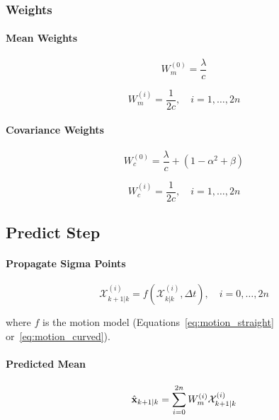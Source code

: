 \subsubsection{Weights}

\paragraph{Mean Weights}
\begin{equation}
W_m^{(0)} = \frac{\lambda}{c}
\label{eq:weight_mean_0}
\end{equation}

\begin{equation}
W_m^{(i)} = \frac{1}{2c}, \quad i = 1, \ldots, 2n
\label{eq:weight_mean_i}
\end{equation}

\paragraph{Covariance Weights}
\begin{equation}
W_c^{(0)} = \frac{\lambda}{c} + (1 - \alpha^2 + \beta)
\label{eq:weight_cov_0}
\end{equation}

\begin{equation}
W_c^{(i)} = \frac{1}{2c}, \quad i = 1, \ldots, 2n
\label{eq:weight_cov_i}
\end{equation}

\subsection{Predict Step}

\paragraph{Propagate Sigma Points}
\begin{equation}
\mathcal{X}_{k+1|k}^{(i)} = f(\mathcal{X}_{k|k}^{(i)}, \Delta t), \quad i = 0, \ldots, 2n
\label{eq:propagate_sigma}
\end{equation}

where $f$ is the motion model (Equations~\ref{eq:motion_straight} or~\ref{eq:motion_curved}).

\paragraph{Predicted Mean}
\begin{equation}
\hat{\mathbf{x}}_{k+1|k} = \sum_{i=0}^{2n} W_m^{(i)} \mathcal{X}_{k+1|k}^{(i)}
\label{eq:predicted_mean}
\end{equation}

